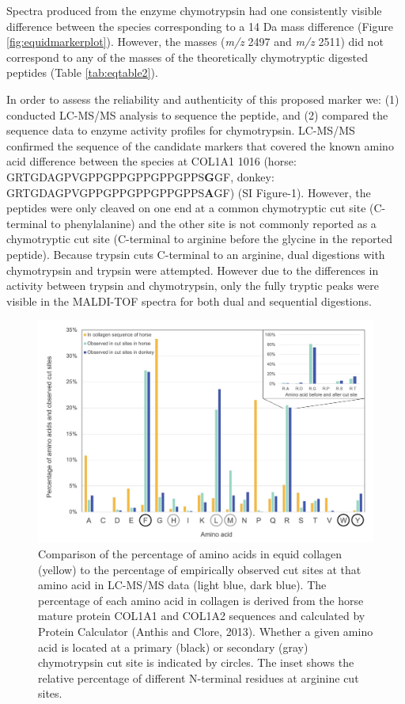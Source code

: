 \documentclass[preprint, 3p, authoryear]{elsarticle} %
\begin{document}
Spectra produced from the enzyme chymotrypsin had one consistently visible difference between the species corresponding to a 14 Da mass difference (Figure \ref{fig:equidmarkerplot}). However, the masses (\emph{m/z} 2497 and \emph{m/z} 2511) did not correspond to any of the masses of the theoretically chymotryptic digested peptides (Table \ref{tab:eqtable2}).

In order to assess the reliability and authenticity of this proposed marker we: (1) conducted LC-MS/MS analysis to sequence the peptide, and (2) compared the sequence data to enzyme activity profiles for chymotrypsin. LC-MS/MS confirmed the sequence of the candidate markers that covered the known amino acid difference between the species at COL1A1 1016 (horse: GRTGDAGPVGPPGPPGPPGPPGPPS\textbf{G}GF, donkey: GRTGDAGPVGPPGPPGPPGPPGPPS\textbf{A}GF) (SI Figure-1). However, the peptides were only cleaved on one end at a common chymotryptic cut site (C-terminal to phenylalanine) and the other site is not commonly reported as a chymotryptic cut site (C-terminal to arginine before the glycine in the reported peptide). Because trypsin cuts C-terminal to an arginine, dual digestions with chymotrypsin and trypsin were attempted. However due to the differences in activity between trypsin and chymotrypsin, only the fully tryptic peaks were visible in the MALDI-TOF spectra for both dual and sequential digestions.



\begin{figure}
\includegraphics[width=1\linewidth]{../img/chymocutsite} \caption{Comparison of the percentage of amino acids in equid collagen (yellow) to the percentage of empirically observed cut sites at that amino acid in LC-MS/MS data (light blue, dark blue). The percentage of each amino acid in collagen is derived from the horse mature protein COL1A1 and COL1A2 sequences and calculated by Protein Calculator (Anthis and Clore, 2013). Whether a given amino acid is located at a primary (black) or secondary (gray) chymotrypsin cut site is indicated by circles. The inset shows the relative percentage of different N-terminal residues at arginine cut sites.}\label{fig:chymocutplot}
\end{figure}
\end{document}
